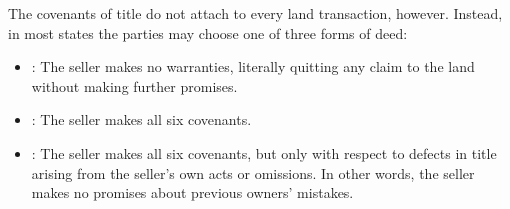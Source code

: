 The covenants of title do not attach to every land transaction, however.
Instead, in most states the parties may choose one of three forms of deed:
\begin{itemize}
\item {}: The seller makes no warranties,
literally quitting any claim to the land without making further promises.
\item {}: The seller makes all
six covenants.
\item {}: The seller makes all
six covenants, but only with respect to defects in title arising from the
seller's own acts or omissions. In other words, the seller makes no promises
about previous owners' mistakes.
\end{itemize}


